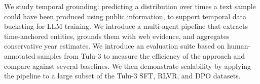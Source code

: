 
We study temporal grounding: predicting a distribution over times a text sample could have been produced using public information, to support temporal data bucketing for LLM training.
We introduce a multi-agent pipeline that extracts time-anchored entities, grounds them with web evidence, and aggregates conservative year estimates.
We introduce an evaluation suite based on human-annotated samples from Tulu-3 to measure the efficiency of the approach and compare against several baselines.
We then demonstrate scalability by applying the pipeline to a large subset of the Tulu-3 SFT, RLVR, and DPO datasets.
